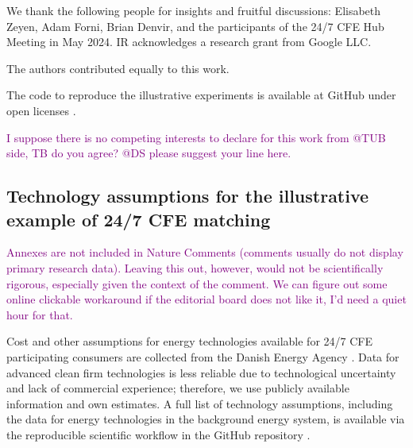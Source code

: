 \documentclass[pdflatex,sn-basic, Numbered]{sn-jnl}%
\theoremstyle{thmstyleone}%
\theoremstyle{thmstyletwo}%
\theoremstyle{thmstylethree}%
\newcommand{\comment}[1]{\textcolor{purple}{#1}}
\begin{document}
\backmatter

 We thank the following people for insights and fruitful discussions: Elisabeth Zeyen, Adam Forni, Brian Denvir, and the participants of the 24/7 CFE Hub Meeting in May 2024. IR acknowledges a research grant from Google LLC.

 The authors contributed equally to this work.

 The code to reproduce the illustrative experiments is available at GitHub under open licenses \cite{code247CFE}.

 \comment{I suppose there is no competing interests to declare for this work from @TUB side, TB do you agree? @DS please suggest your line here.}




\FloatBarrier

\subsection*{Technology assumptions for the illustrative example of 24/7 CFE matching}
\label{sec:annex}

\comment{Annexes are not included in Nature Comments (comments usually do not display primary research data).  Leaving this out, however, would not be scientifically rigorous, especially given the context of the comment. We can figure out some online clickable workaround if the editorial board does not like it, I'd need a quiet hour for that.}

Cost and other assumptions for energy technologies available for 24/7 CFE participating consumers are collected from the Danish Energy Agency \cite{DEA-technologydata}.
Data for advanced clean firm technologies is less reliable due to technological uncertainty and lack of commercial experience; therefore, we use publicly available information and own estimates.
A full list of technology assumptions, including the data for energy technologies in the background energy system, is available via the reproducible scientific workflow in the GitHub repository \cite{code247CFE}.
\end{document}
